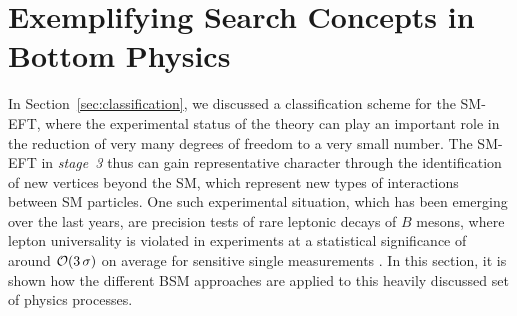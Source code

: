 


\section{Exemplifying Search Concepts in Bottom Physics}\label{sec:BphysicsConcepts}

In Section~\ref{sec:classification}, we discussed a classification
scheme for the SM-EFT, where the experimental status of the theory can
play an important role in the reduction of very many degrees of
freedom to a very small number. The SM-EFT in \emph{stage~3} thus can
gain representative character through the identification of new
vertices beyond the SM, which represent new types of interactions
between SM particles. One such experimental situation, which has been
emerging over the last years, are precision tests of rare leptonic
decays of $B$ mesons, where lepton universality is
violated in experiments
at a statistical significance of around ${\cal O}(3\,\sigma)$ on
average for sensitive single measurements \citep{Aaij:2015oid,Aaij:2017vbb,Aaij:2019wad,Abdesselam:2019dgh,Abdesselam:2019wac,Buttazzo:2017ixm}.
In this section, it is shown how the different BSM approaches are applied to this heavily discussed set of physics processes.

